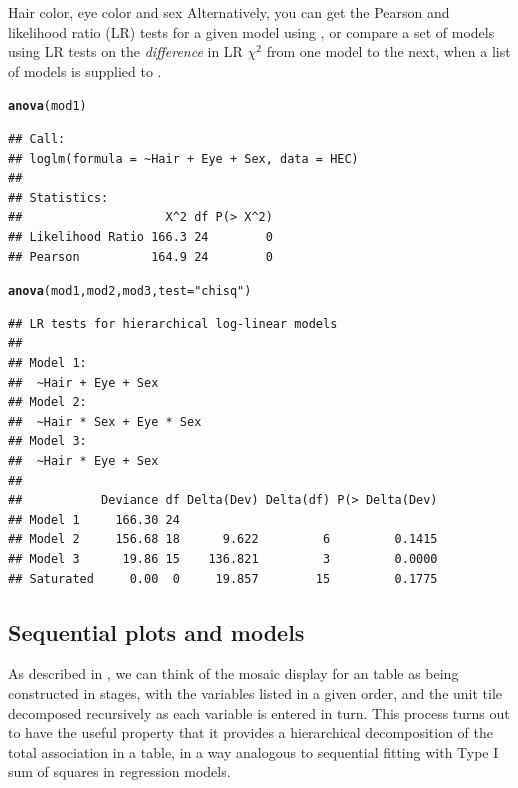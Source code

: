 \documentclass[11pt]{book}\usepackage[]{graphicx}\usepackage[]{color}
\makeatletter
\newcommand{\hlstr}[1]{\textcolor[rgb]{0.192,0.494,0.8}{#1}}%
\newcommand{\hlstd}[1]{\textcolor[rgb]{0.345,0.345,0.345}{#1}}%
\newcommand{\hlkwc}[1]{\textcolor[rgb]{0.333,0.667,0.333}{#1}}%
\newcommand{\hlkwd}[1]{\textcolor[rgb]{0.737,0.353,0.396}{\textbf{#1}}}%
\newenvironment{kframe}{%
 \def\at@end@of@kframe{}%
 \ifinner\ifhmode%
  \def\at@end@of@kframe{\end{minipage}}%
  \begin{minipage}{\columnwidth}%
 \fi\fi%
 \def\FrameCommand##1{\hskip\@totalleftmargin \hskip-\fboxsep
 \colorbox{shadecolor}{##1}\hskip-\fboxsep
     \hskip-\linewidth \hskip-\@totalleftmargin \hskip\columnwidth}%
 \MakeFramed {\advance\hsize-\width
   \@totalleftmargin\z@ \linewidth\hsize
   \@setminipage}}%
 {\par\unskip\endMakeFramed%
 \at@end@of@kframe}
\newenvironment{knitrout}{}{} %
\renewenvironment{knitrout}{\small\renewcommand{\baselinestretch}{.85}}{} %
\makeatother
\begin{document}
\begin{Example}[HEC2]{Hair color, eye color and sex}
Alternatively, you can get the Pearson and likelihood ratio (LR) tests
for a given model using ,
or compare a set of models using LR tests on the \emph{difference} in
LR $\chi^2$ from one model to the next, when a list of models is supplied
to .
\begin{knitrout}
\color{fgcolor}\begin{kframe}
\begin{alltt}
\hlkwd{anova}\hlstd{(mod1)}
\end{alltt}
\begin{verbatim}
## Call:
## loglm(formula = ~Hair + Eye + Sex, data = HEC)
## 
## Statistics:
##                    X^2 df P(> X^2)
## Likelihood Ratio 166.3 24        0
## Pearson          164.9 24        0
\end{verbatim}
\begin{alltt}
\hlkwd{anova}\hlstd{(mod1, mod2, mod3,} \hlkwc{test}\hlstd{=}\hlstr{"chisq"}\hlstd{)}
\end{alltt}
\begin{verbatim}
## LR tests for hierarchical log-linear models
## 
## Model 1:
##  ~Hair + Eye + Sex 
## Model 2:
##  ~Hair * Sex + Eye * Sex 
## Model 3:
##  ~Hair * Eye + Sex 
## 
##           Deviance df Delta(Dev) Delta(df) P(> Delta(Dev)
## Model 1     166.30 24                                    
## Model 2     156.68 18      9.622         6         0.1415
## Model 3      19.86 15    136.821         3         0.0000
## Saturated     0.00  0     19.857        15         0.1775
\end{verbatim}
\end{kframe}
\end{knitrout}


\end{Example}

\subsection{Sequential plots and models}\label{sec:mosaic-seq}

As described in ,
we can think of the mosaic display for an \nway table as being constructed in stages,
with the variables listed in a given order, and the unit tile decomposed recursively
as each variable is entered in turn.  This process turns out to have the useful property
that it provides a hierarchical decomposition of the total association in a table,
in a way analogous to sequential fitting with Type I sum of squares in regression models.
\end{document}
